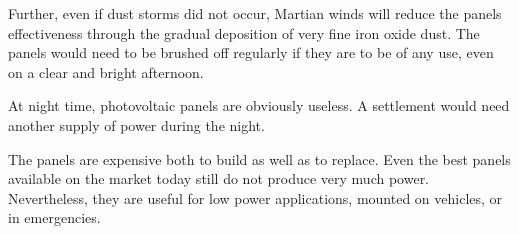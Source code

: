 Further, even if dust storms did not occur, Martian winds will reduce the panels effectiveness through the gradual deposition of very fine iron oxide dust. The panels would need to be brushed off regularly if they are to be of any use, even on a clear and bright afternoon.

At night time, photovoltaic panels are obviously useless. A settlement would need another supply of power during the night.

The panels are expensive both to build as well as to replace. Even the best panels available on the market today still do not produce very much power. Nevertheless, they are useful for low power applications, mounted on vehicles, or in emergencies.

